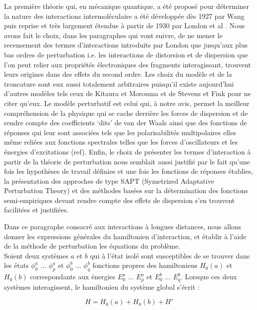 La première théorie qui, en mécanique quantique, a été proposé pour déterminer la nature des interactions intermoléculaire a été développée dès 1927 par Wang \cite{wang1927mutual}  puis reprise et très largement étendue à partir de 1930 par London et al \cite{london1930z}. Nous avons fait le choix, dans les paragraphes qui vont suivre, de ne mener le recensement des termes d’interactions introduits par London que jusqu’aux plus bas ordres de perturbation i.e. les interactions de distorsion et de dispersion que l’on peut relier aux propriétés électroniques des fragments interagissant, trouvent leurs origines dans des effets du second ordre. Les choix du modèle et de la troncature sont eux aussi totalement arbitraires puisqu’il existe aujourd’hui d’autres modèles tels ceux de  Kitaura et Morouma \cite{morokuma1977molecules} et de Stevens et Fink \cite{stevens1987frozen} pour ne citer qu’eux. Le modèle perturbatif est celui qui, à notre avis, permet la meilleur compréhension de la physique qui se cache derrière les forces de dispersion et de rendre compte des coefficients ‘dits’ de van der Waals ainsi que des fonctions de réponses qui leur sont associées tels que les polarisabilités multipolaires elles même reliées aux fonctions spectrales telles que les forces d’oscillateurs et les énergies d’excitations (ref). Enfin, le choix de présenter les termes d’interaction à partir de la théorie de perturbation nous semblait aussi justifié par le fait qu’une fois les hypothèses de travail définies et une fois les fonctions de réponses établies, la présentation des approches de type SAPT (Symetrized Adaptative Perturbation Theory) et des méthodes basées sur la détermination des fonctions semi-empiriques devant rendre compte des effets de dispersion s’en trouvent facilitées et justifiées.


Dans ce paragraphe consacré aux interactions à longues distances, nous allons donner les expressions générales du hamiltonien d'interaction, et établir à l'aide de la méthode de perturbation les équations du problème.\\ 

Soient deux systèmes $a$ et $b$ qui à l'état isolé sont susceptibles de se trouver dans les états $\phi_{0}^{a}$ ... $\phi_{p}^{a}$ et $\phi_{0}^{b}$ ... $\phi_{q}^{b}$ fonctions propres des hamiltoniens $H_{0}(a)$ et $H_{0}(b)$ correspondants aux énergies $E_{0}^{a}$ ... $E_{p}^{a}$ et $E_{0}^{b}$ ... $E_{q}^{b}$. Lorsque ces deux systèmes interagissent, le hamiltonien du système global s'écrit : 
	
\begin{equation}
H = H_{0}(a) + H_{0}(b) + H'
\end{equation}
	
